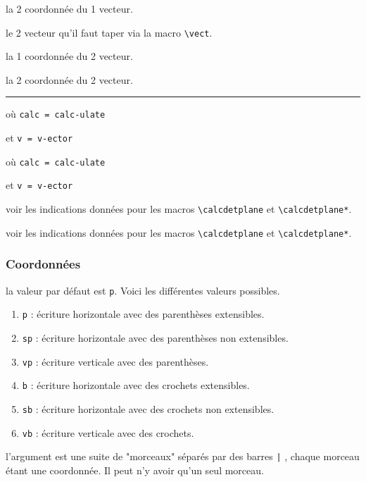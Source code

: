 \documentclass[12pt,a4paper]{article}
\newcommand\env[1]{\texttt{#1}}
\newcommand\macro[1]{\env{\textbackslash{}#1}}
\theoremstyle{definition}
\newcommand\separation{
	\medskip
	\hfill\rule{0.5\textwidth}{0.75pt}\hfill
	\medskip
}
\newcommand\mwhyprefix[2]{%
	\texttt{#1 = #1-#2}%
}
\begin{document}
 la 2\ieme{} coordonnée du 1\ier{} vecteur.

 le 2\ieme{} vecteur qu'il faut taper via la macro \macro{vect}.

 la 1\iere{} coordonnée du 2\ieme{} vecteur.

 la 2\ieme{} coordonnée du 2\ieme{} vecteur.


\separation


  où \quad \mwhyprefix{calc}{ulate}
                                      et \mwhyprefix{v}{ector}

 où \quad \mwhyprefix{calc}{ulate}
                                      et \mwhyprefix{v}{ector}


\IDoption{} voir les indications données pour les macros \macro{calcdetplane} et \macro{calcdetplane*}.

 voir les indications données pour les macros \macro{calcdetplane} et \macro{calcdetplane*}.
\subsubsection{Coordonnées} \label{coordinates-tech}



\IDoption{} la valeur par défaut est \verb+p+. Voici les différentes valeurs possibles.
\begin{enumerate}
	\item \verb+p+ : écriture horizontale avec des parenthèses extensibles.

	\item \verb+sp+ : écriture horizontale avec des parenthèses non extensibles.

	\item \verb+vp+ : écriture verticale avec des parenthèses.

	\item \verb+b+ : écriture horizontale avec des crochets extensibles.

	\item \verb+sb+ : écriture horizontale avec des crochets non extensibles.

	\item \verb+vb+ : écriture verticale avec des crochets.
\end{enumerate}


\IDarg{} l'argument est une suite de "morceaux" séparés par des barres \verb+|+ , chaque morceau étant une coordonnée. Il peut n'y avoir qu'un seul morceau.
\end{document}
